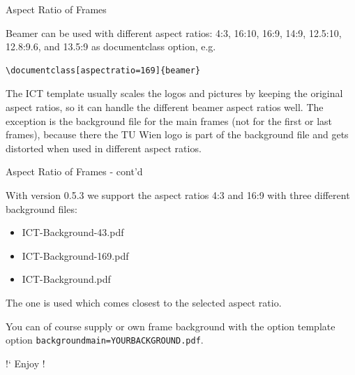 \documentclass[aspectratio=169]{beamer}
\begin{document}
\begin{frame}[fragile]{Aspect Ratio of Frames}
  
  \begin{block}{}
    Beamer can be used with different aspect ratios: 4:3, 16:10, 16:9,
    14:9, 12.5:10, 12.8:9.6, and 13.5:9 as documentclass option, e.g.

    
\begin{verbatim}
\documentclass[aspectratio=169]{beamer}
\end{verbatim}

    The ICT template usually scales the logos and pictures by keeping
    the original aspect ratios, so it can handle the different beamer
    aspect ratios well. The exception is the background file for the
    main frames (not for the first or last frames), because there the
    TU Wien logo is part of the background file and gets distorted when
    used in different aspect ratios.
\end{block}

\end{frame}

\begin{frame}[fragile]{Aspect Ratio of Frames - cont'd}
  
  \begin{block}{}
    With version 0.5.3 we support the aspect ratios 4:3 and 16:9 with
    three different background files:

    
    \begin{itemize}
    \item ICT-Background-43.pdf
    \item ICT-Background-169.pdf
    \item ICT-Background.pdf
    \end{itemize}

    The one is used which comes closest to the selected aspect ratio.

    \vspace{3ex}
    You can of course supply or own frame background with the option
    template  option \verb|backgroundmain=YOURBACKGROUND.pdf|.
    
\end{block}

\end{frame}

\begin{frame}{}

  \centering\Huge
  !` Enjoy !
\end{frame}
\end{document}
